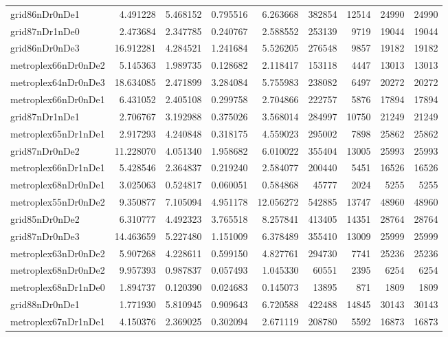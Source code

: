 \begin{longtable}{|l|r|r|r|r|r|r|r|r|}
grid86nDr0nDe1 & 4.491228 & 5.468152 & 0.795516 & 6.263668 & 382854 & 12514 & 24990 & 24990 \\
grid87nDr1nDe0 & 2.473684 & 2.347785 & 0.240767 & 2.588552 & 253139 & 9719 & 19044 & 19044 \\
grid86nDr0nDe3 & 16.912281 & 4.284521 & 1.241684 & 5.526205 & 276548 & 9857 & 19182 & 19182 \\
metroplex66nDr0nDe2 & 5.145363 & 1.989735 & 0.128682 & 2.118417 & 153118 & 4447 & 13013 & 13013 \\
metroplex64nDr0nDe3 & 18.634085 & 2.471899 & 3.284084 & 5.755983 & 238082 & 6497 & 20272 & 20272 \\
metroplex66nDr0nDe1 & 6.431052 & 2.405108 & 0.299758 & 2.704866 & 222757 & 5876 & 17894 & 17894 \\
grid87nDr1nDe1 & 2.706767 & 3.192988 & 0.375026 & 3.568014 & 284997 & 10750 & 21249 & 21249 \\
metroplex65nDr1nDe1 & 2.917293 & 4.240848 & 0.318175 & 4.559023 & 295002 & 7898 & 25862 & 25862 \\
grid87nDr0nDe2 & 11.228070 & 4.051340 & 1.958682 & 6.010022 & 355404 & 13005 & 25993 & 25993 \\
metroplex66nDr1nDe1 & 5.428546 & 2.364837 & 0.219240 & 2.584077 & 200440 & 5451 & 16526 & 16526 \\
metroplex68nDr0nDe1 & 3.025063 & 0.524817 & 0.060051 & 0.584868 & 45777 & 2024 & 5255 & 5255 \\
metroplex55nDr0nDe2 & 9.350877 & 7.105094 & 4.951178 & 12.056272 & 542885 & 13747 & 48960 & 48960 \\
grid85nDr0nDe2 & 6.310777 & 4.492323 & 3.765518 & 8.257841 & 413405 & 14351 & 28764 & 28764 \\
grid87nDr0nDe3 & 14.463659 & 5.227480 & 1.151009 & 6.378489 & 355410 & 13009 & 25999 & 25999 \\
metroplex63nDr0nDe2 & 5.907268 & 4.228611 & 0.599150 & 4.827761 & 294730 & 7741 & 25236 & 25236 \\
metroplex68nDr0nDe2 & 9.957393 & 0.987837 & 0.057493 & 1.045330 & 60551 & 2395 & 6254 & 6254 \\
metroplex68nDr1nDe0 & 1.894737 & 0.120390 & 0.024683 & 0.145073 & 13895 & 871 & 1809 & 1809 \\
grid88nDr0nDe1 & 1.771930 & 5.810945 & 0.909643 & 6.720588 & 422488 & 14845 & 30143 & 30143 \\
metroplex67nDr1nDe1 & 4.150376 & 2.369025 & 0.302094 & 2.671119 & 208780 & 5592 & 16873 & 16873 \\

\end{longtable}
